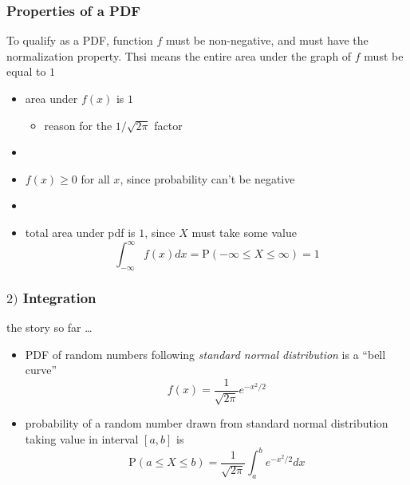\documentclass[english,14pt]{beamer}
\newcommand\red[1]{{\color{red} #1}}
\begin{document}

\begin{frame}[fragile]

\frametitle{Properties of a PDF}

To qualify as a PDF, function $f$ must be non-negative, and must have the normalization property. Thsi means the entire area under the graph of $f$ must be equal to $1$

\begin{itemize}
	\item area under $f(x)$ is $1$
	\begin{itemize}
		\item reason for the $1/\sqrt{2\pi}$ factor
	\end{itemize}
	
	\item[]
	
	\item $f(x) \geq 0$ for all $x$, since probability can't be negative
	
	\item[]
	
	\item total area under pdf is $1$, since $X$ must take some value
\[
\int_{-\infty}^\infty f(x) dx = \mathrm{P}(-\infty \leq X \leq \infty) = 1
\]
\end{itemize}

\end{frame}


\begin{frame}[fragile]

\frametitle{$2)$ Integration}

the story so far \ldots

\begin{itemize}
	\item PDF of random numbers following \red{\emph{standard normal distribution}} is a ``bell curve''
\[
	f(x) = \frac{1}{\sqrt{2\pi}} e^{-x^2/2}
\]
	\item probability of a random number drawn from standard normal distribution taking value in interval $[a,b]$ is
	\[
	\mathrm{P}(a \leq X \leq b) = \frac{1}{\sqrt{2\pi}} \int_a^b  e^{-x^2/2} dx
	\]

\end{itemize}

\end{frame}
\end{document}
